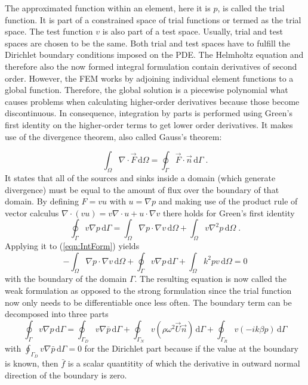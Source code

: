 \documentclass[%
  a4paper,oneside,%
  11pt,%
  smallchapters,
  style=printdev,
  extramargin,
  green,%
  rgb, <cmyk>
  ]{tubsbook}
\begin{document}
The approximated function within an element, here it is $p$, is called the trial function. It is part of a constrained space of trial functions or termed as the trial space. The test function $v$ is also part of a test space. Usually, trial and test spaces are chosen to be the same. Both trial and test spaces have to fulfill the Dirichlet boundary conditions imposed on the PDE.
The Helmholtz equation and therefore also the now formed integral formulation contain derivatives of second order. However, the FEM works by adjoining individual element functions to a global function. Therefore, the global solution is a piecewise polynomial \cite{langtangen2019} what causes problems when calculating higher-order derivatives because those become discontinuous. In consequence, integration by parts is performed using Green's first identity \cite[pp. 53,54]{atalla2015} on the higher-order terms to get lower order derivatives. It makes use of the divergence theorem, also called Gauss's theorem:

\begin{equation}
\int_{\Omega}  \nabla \cdot \vec{F} \,\mathrm{d}\Omega = \oint_{\Gamma} \vec{F} \cdot \vec{n} \,\mathrm{d}\Gamma \; .
\label{eqn:DivTheo}
\end{equation}
It states that all of the sources and sinks inside a domain (which generate divergence) must be equal to the amount of flux over the boundary of that domain. 
By defining  $F = vu$ with $u = \nabla p$ and making use of the product rule of vector calculus $\nabla \cdot (v u) = v \nabla \cdot u + u \cdot \nabla v$ there holds for Green's first identity
\begin{equation}
\oint_{\Gamma} v \nabla p \,\mathrm{d}\Gamma = \int_{\Omega} \nabla p \cdot \nabla v \,\mathrm{d}\Omega + \int_{\Omega}  v\nabla^2 p \,\mathrm{d}\Omega \; .
\end{equation}
%
Applying it to (\ref{eqn:IntForm}) yields
\begin{equation}
-\int_{\Omega} \nabla p \cdot \nabla v \,\mathrm{d}\Omega + \oint_{\Gamma} v \nabla p  \,\mathrm{d}\Gamma+ \int_{\Omega} k^2 pv \,\mathrm{d}\Omega = 0
\label{eqn:WeakHelmholtz}
\end{equation}
with the boundary of the domain $\Gamma$.
The resulting equation is now called the weak formulation as opposed to the strong formulation since the trial function now only needs to be differentiable once less often.
The boundary term can be decomposed into three parts
\begin{equation}
\oint_{\Gamma} v \nabla p  \,\mathrm{d}\Gamma = \oint_{\Gamma_D} v \nabla \bar{p}  \,\mathrm{d}\Gamma + \oint_{\Gamma_N} v (\rho \omega^2 \vec{U}\vec{n})  \,\mathrm{d}\Gamma + \oint_{\Gamma_R} v(-ik\beta p)  \,\mathrm{d}\Gamma
\end{equation}
with $\oint_{\Gamma_D} v \nabla \bar{p}  \,\mathrm{d}\Gamma = 0$ for the Dirichlet part because if the value at the boundary is known, then $\bar{f}$ is a scalar quantitity of which the derivative in outward normal direction of the boundary is zero.
\end{document}
